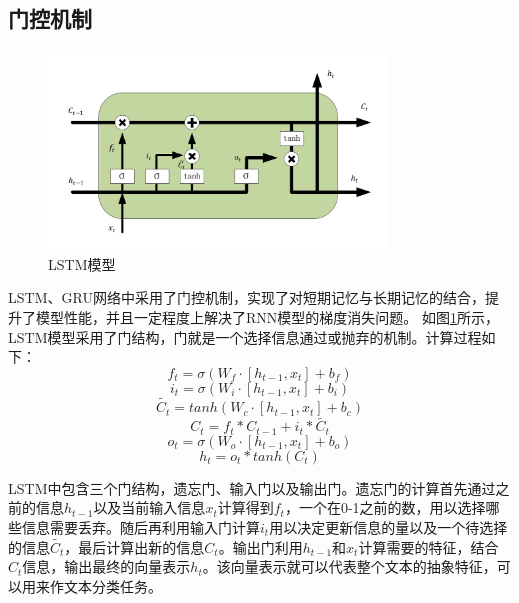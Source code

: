 \subsection{门控机制}
\begin{figure}[htb]%
	\setlength{\belowcaptionskip}{0pt}
	\centering
	\includegraphics[width=0.8\textwidth]{pic/2-14.png}
	\caption{LSTM模型}
	\label{lstm}
\end{figure}
LSTM、GRU网络中采用了门控机制，实现了对短期记忆与长期记忆的结合，提升了模型性能，并且一定程度上解决了RNN模型的梯度消失问题。
如图\ref{lstm}所示，LSTM模型采用了门结构，门就是一个选择信息通过或抛弃的机制。计算过程如下：
\begin{equation}\label{LSTMFormula1}
	f_t=\sigma(W_f\cdot\left[h_{t-1},x_t\right]+b_f)
\end{equation}
\begin{equation}\label{LSTMFormula2}
	i_t=\sigma\left(W_i\cdot\left[h_{t-1},x_t\right]+b_i\right)
\end{equation}
\begin{equation}\label{LSTMFormula3}
	\widetilde{C_t}=tanh\left(W_c\cdot\left[h_{t-1},x_t\right]+b_c\right)
\end{equation}
\begin{equation}\label{LSTMFormula4}
	C_t=f_t\ast C_{t-1}+i_t\ast \widetilde{C_t}
\end{equation}
\begin{equation}\label{LSTMFormula5}
	o_t=\sigma\left(W_o\cdot\left[h_{t-1},x_t\right]+b_o\right)
\end{equation}
\begin{equation}\label{LSTMFormula6}
	h_t=o_t\ast tanh\left(C_t\right)
\end{equation}

LSTM中包含三个门结构，遗忘门、输入门以及输出门。遗忘门的计算首先通过之前的信息$h_{t-1}$以及当前输入信息$x_t$计算得到$f_t$，一个在0-1之前的数，用以选择哪些信息需要丢弃。随后再利用输入门计算$i_t$用以决定更新信息的量以及一个待选择的信息$\widetilde{C_t}$，最后计算出新的信息$C_t$。输出门利用$h_{t-1}$和$x_t$计算需要的特征，结合$C_t$信息，输出最终的向量表示$h_t$。该向量表示就可以代表整个文本的抽象特征，可以用来作文本分类任务。

